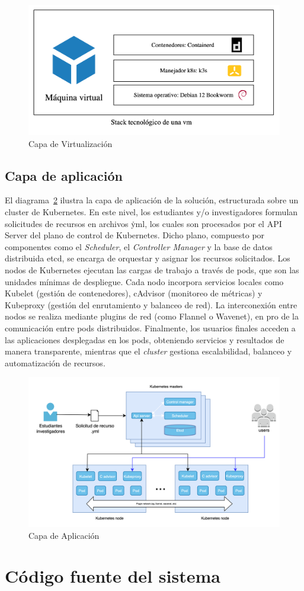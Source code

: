 \begin{figure}[H]
    \centering
    \includegraphics[width=\textwidth]{tablas-images/cp6/disenio-N2-B.png}
    \caption{Capa de Virtualización}\label{fig:virtualizacion}
\end{figure}

\subsection{Capa de aplicación}
\noindent
El diagrama~\ref{fig:aplicacion} ilustra la capa de aplicación de la solución, estructurada sobre un cluster de Kubernetes. En este nivel, los estudiantes y/o investigadores formulan solicitudes de recursos en archivos \.yml, los cuales son procesados por el API Server del plano de control de Kubernetes. Dicho plano, compuesto por componentes como el \textit{Scheduler}, el \textit{Controller Manager} y la base de datos distribuida etcd, se encarga de orquestar y asignar los recursos solicitados.
Los nodos de Kubernetes ejecutan las cargas de trabajo a través de pods, que son las unidades mínimas de despliegue. Cada nodo incorpora servicios locales como Kubelet (gestión de contenedores), cAdvisor (monitoreo de métricas) y Kubeproxy (gestión del enrutamiento y balanceo de red). La interconexión entre nodos se realiza mediante plugins de red (como Flannel o Wavenet), en pro de la comunicación entre pods distribuidos.
Finalmente, los usuarios finales acceden a las aplicaciones desplegadas en los pods, obteniendo servicios y resultados de manera transparente, mientras que el \textit{cluster} gestiona escalabilidad, balanceo y automatización de recursos.
\begin{figure}[H]
    \centering
    \includegraphics[width=\textwidth]{tablas-images/cp6/disenio-N3.png}
    \caption{Capa de Aplicación}\label{fig:aplicacion}
\end{figure}

\section{Código fuente del sistema}